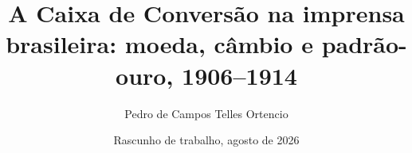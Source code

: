 \title{A Caixa de Conversão na imprensa brasileira: moeda, câmbio e padrão-ouro, 1906--1914}
\author{Pedro de Campos Telles Ortencio}
\date{Rascunho de trabalho, agosto de 2026}
